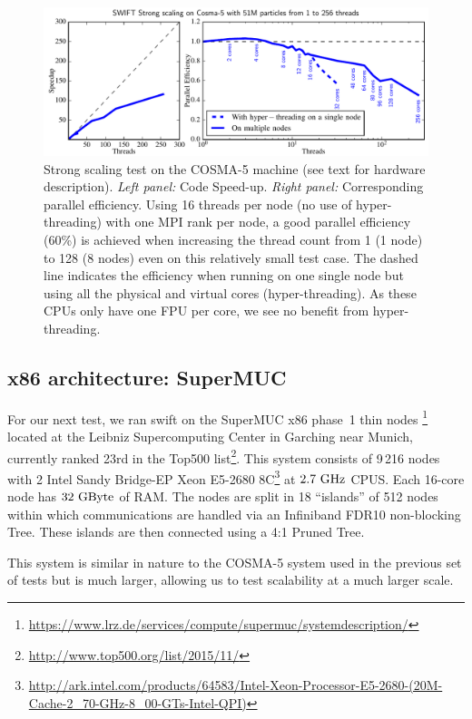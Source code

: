 \documentclass{sig-alternate-05-2015}
\newcommand{\swift}{{\sc swift}\xspace}
\begin{document}
\begin{figure}
\centering
\includegraphics[width=\textwidth]{Figures/scalingCosma}
\caption{Strong scaling test on the COSMA-5 machine (see text for hardware
  description). \textit{Left panel:} Code Speed-up. \textit{Right panel:}
  Corresponding parallel efficiency.  Using 16 threads per node (no use of
  hyper-threading) with one MPI rank per node, a good parallel efficiency (60\%)
  is achieved when increasing the thread count from 1 (1 node) to 128 (8 nodes)
  even on this relatively small test case. The dashed line indicates the
  efficiency when running on one single node but using all the physical and
  virtual cores (hyper-threading). As these CPUs only have one FPU per core, we
  see no benefit from hyper-threading.
  \label{fig:cosma}}
\end{figure}



\subsection{x86 architecture: SuperMUC}

For our next test, we ran \swift on the SuperMUC x86 phase~1 thin
nodes \footnote{\url{https://www.lrz.de/services/compute/supermuc/systemdescription/}}
located at the Leibniz Supercomputing Center in Garching near Munich,
currently ranked 23rd in the Top500 list\footnote{\url{http://www.top500.org/list/2015/11/}}. This
system consists of 9\,216 nodes with 2 Intel Sandy Bridge-EP Xeon E5-2680
8C\footnote{\url{http://ark.intel.com/products/64583/Intel-Xeon-Processor-E5-2680-(20M-Cache-2_70-GHz-8_00-GTs-Intel-QPI)}}
at $2.7~\rm{GHz}$ CPUS. Each 16-core node has $32~\rm{GByte}$ of RAM.
The nodes are split in 18
``islands'' of 512 nodes within which communications are handled via an
Infiniband FDR10 non-blocking Tree. These islands are then connected using a 4:1
Pruned Tree.

This system is similar in nature to the COSMA-5 system used in the previous set
of tests but is much larger, allowing us to test scalability at a much larger
scale.
\end{document}
